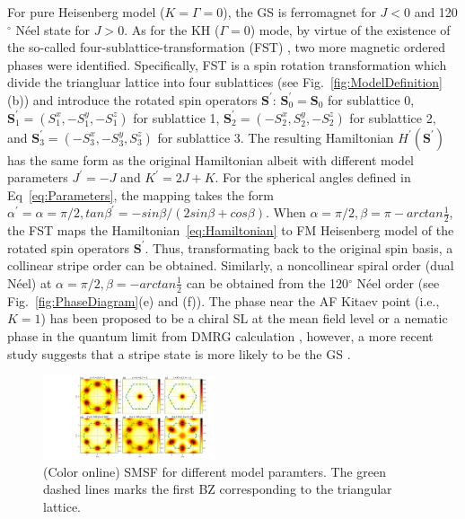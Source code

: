 \documentclass[aps,prb,reprint,amsfonts,amsmath,amssymb,showpacs,groupedaddress,superscriptaddress]{revtex4-1}
\begin{document}
For pure Heisenberg model ($K=\Gamma=0$), the GS is ferromagnet for $J<0$ and 120$^\circ$ N\'{e}el state for $J>0$. As for the KH ($\Gamma=0$) mode, by virtue of the existence of the so-called four-sublattice-transformation (FST) \cite{PhysRevB.89.014414}, two more magnetic ordered phases were identified. Specifically, FST is a spin rotation transformation which divide the triangluar lattice into four sublattices (see Fig.~\ref{fig:ModelDefinition}(b)) and introduce the rotated spin operators $\bm{S}^{'}$: $\bm{S}_{0}^{'} = \bm{S}_0$ for sublattice 0, $\bm{S}_{1}^{'} = (S_1^x, -S_1^y, -S_1^z)$ for sublattice 1, $\bm{S}_{2}^{'} = (-S_2^x, S_2^y, -S_2^z)$ for sublattice 2, and $\bm{S}_{3}^{'} = (-S_3^x, -S_3^y, S_3^z)$ for sublattice 3. The resulting Hamiltonian $H^{'}(\bm{S}^{'})$ has the same form as the original Hamiltonian albeit with different model parameters $J^{'} = -J$ and $K^{'} = 2J + K$. For the spherical angles defined in Eq~\eqref{eq:Parameters}, the mapping takes the form $\alpha^{'}=\alpha=\pi/2, tan\beta^{'}=-sin\beta/(2sin\beta + cos\beta)$. When $\alpha=\pi/2, \beta=\pi - arctan\frac{1}{2}$, the FST maps the Hamiltonian~\eqref{eq:Hamiltonian} to FM Heisenberg model of the rotated spin operators $\bm{S}^{'}$. Thus, transformating back to the original spin basis, a collinear stripe order can be obtained. Similarly, a noncollinear spiral order (dual N\'{e}el) at $\alpha=\pi/2, \beta=-arctan\frac{1}{2}$ can be obtained from the 120$^\circ$ N\'{e}el order (see Fig.~\ref{fig:PhaseDiagram}(e) and (f)). The phase near the AF Kitaev point (i.e., $K=1$) has been proposed to be a chiral SL at the mean field level \cite{KaiLi2015} or a nematic phase in the quantum limit from DMRG calculation \cite{PhysRevB.91.155135}, however, a more recent study suggests that a stripe state is more likely to be the GS \cite{PhysRevX.9.021017}.

\begin{figure}
    \includegraphics[width=0.45\textwidth]{Fig3.pdf}
    \caption{\label{fig:StructureFactors}(Color online) SMSF for different model paramters. The green dashed lines marks the first BZ corresponding to the triangular lattice.}
\end{figure}
\end{document}
